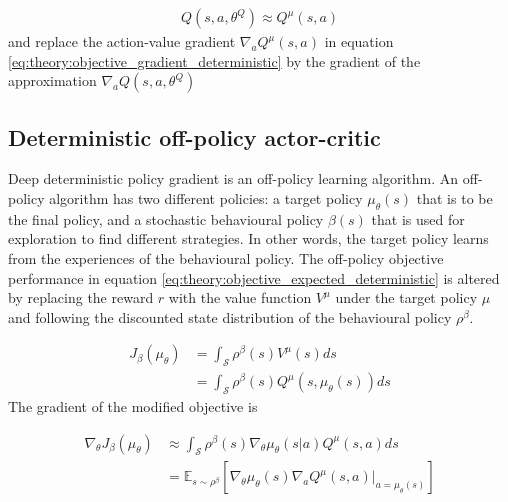 \documentclass[class=book, crop=false]{standalone}
\begin{document}
\begin{equation}
   \begin{aligned}\label{eq:theory:action-value_approx}
    Q(s,a,\theta^{Q}) \approx Q^{\mu}(s,a)
\end{aligned} 
\end{equation}
and replace the action-value gradient $\nabla_{a} Q^{\mu}(s,a)$ in equation \eqref{eq:theory:objective_gradient_deterministic} by
the gradient of the approximation $\nabla_{a} Q(s,a,\theta^{Q})$

\subsection{Deterministic off-policy actor-critic}
Deep deterministic policy gradient is an off-policy learning algorithm. An off-policy algorithm has two different policies: a target policy $\mu_{\theta}(s)$ that is to be the final policy, and a stochastic behavioural policy $\beta(s)$ that is used for exploration to find different strategies. In other words, the target policy learns from the experiences of the behavioural policy. The off-policy objective performance in equation \eqref{eq:theory:objective_expected_deterministic} is altered by replacing the reward $r$ with the value function $V^{\mu}$ under the target policy $\mu$ and following the discounted state distribution of the behavioural policy $\rho^{\beta}$.

\begin{equation}
   \begin{aligned}\label{eq:theory:objective_expected_ooff_policy}
    J_{\beta}(\mu_{\theta}) &=
    \int_{\mathcal{S}}
    \rho^{\beta}(s)V^{\mu}(s) ds 
    \\
    &=
    \int_{\mathcal{S}}
    \rho^{\beta}(s)Q^{\mu}(s,\mu_{\theta}(s)) ds
\end{aligned} 
\end{equation}
The gradient of the modified objective is

\begin{equation}
   \begin{aligned}\label{eq:theory:objective_gradient_deterministic_off_policy}
    \nabla_{\theta}J_{\beta}(\mu_{\theta}) &\approx
    \int_{\mathcal{S}}
    \rho^{\beta}(s)
    \nabla_{\theta} \mu_{\theta}(s|a)
    Q^{\mu}(s,a)ds 
    \\
    &= \mathbb{E}_{s\sim \rho^{\beta}}
    [\nabla_{\theta} \mu_{\theta}(s)
    \nabla_{a} Q^{\mu}(s,a)|_{a = \mu_{\theta}(s)}]
\end{aligned} 
\end{equation}
\end{document}
